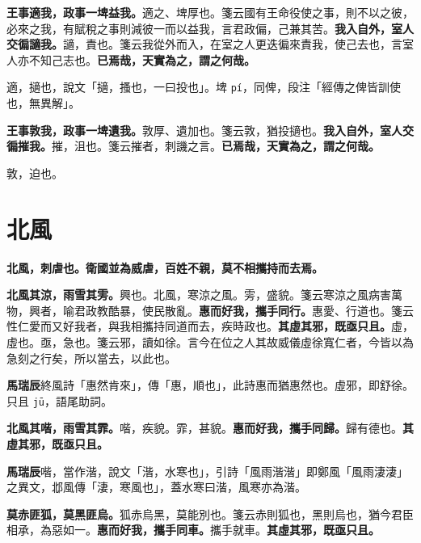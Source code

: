 \textbf{王事適我，政事一埤益我。}{\footnotesize 適之、埤厚也。箋云國有王命役使之事，則不以之彼，必來之我，有賦稅之事則減彼一而以益我，言君政偏，己兼其苦。}\textbf{我入自外，室人交徧讁我。}{\footnotesize 讁，責也。箋云我從外而入，在室之人更迭徧來責我，使己去也，言室人亦不知己志也。}\textbf{已焉哉，天實為之，謂之何哉。}

\begin{quoting}適，擿也，說文「擿，搔也，一曰投也」。埤 \texttt{pí}，同俾，段注「經傳之俾皆訓使也，無異解」。\end{quoting}

\textbf{王事敦我，政事一埤遺我。}{\footnotesize 敦厚、遺加也。箋云敦，猶投擿也。}\textbf{我入自外，室人交徧摧我。}{\footnotesize 摧，沮也。箋云摧者，刺譏之言。}\textbf{已焉哉，天實為之，謂之何哉。}

\begin{quoting}敦，迫也。\end{quoting}

\section{北風}


\textbf{北風，刺虐也。衛國並為威虐，百姓不親，莫不相攜持而去焉。}

\textbf{北風其涼，雨雪其雱。}{\footnotesize 興也。北風，寒涼之風。雱，盛貌。箋云寒涼之風病害萬物，興者，喻君政教酷暴，使民散亂。}\textbf{惠而好我，攜手同行。}{\footnotesize 惠愛、行道也。箋云性仁愛而又好我者，與我相攜持同道而去，疾時政也。}\textbf{其虛其邪，既亟只且。}{\footnotesize 虛，虛也。亟，急也。箋云邪，讀如徐。言今在位之人其故威儀虛徐寬仁者，今皆以為急刻之行矣，所以當去，以此也。}

\begin{quoting}\textbf{馬瑞辰}終風詩「惠然肯來」，傳「惠，順也」，此詩惠而猶惠然也。虛邪，即舒徐。只且 \texttt{jū}，語尾助詞。\end{quoting}

\textbf{北風其喈，雨雪其霏。}{\footnotesize 喈，疾貌。霏，甚貌。}\textbf{惠而好我，攜手同歸。}{\footnotesize 歸有德也。}\textbf{其虛其邪，既亟只且。}

\begin{quoting}\textbf{馬瑞辰}喈，當作湝，說文「湝，水寒也」，引詩「風雨湝湝」即鄭風「風雨淒淒」之異文，邶風傳「淒，寒風也」，蓋水寒曰湝，風寒亦為湝。\end{quoting}

\textbf{莫赤匪狐，莫黑匪烏。}{\footnotesize 狐赤烏黑，莫能別也。箋云赤則狐也，黑則烏也，猶今君臣相承，為惡如一。}\textbf{惠而好我，攜手同車。}{\footnotesize 攜手就車。}\textbf{其虛其邪，既亟只且。}


